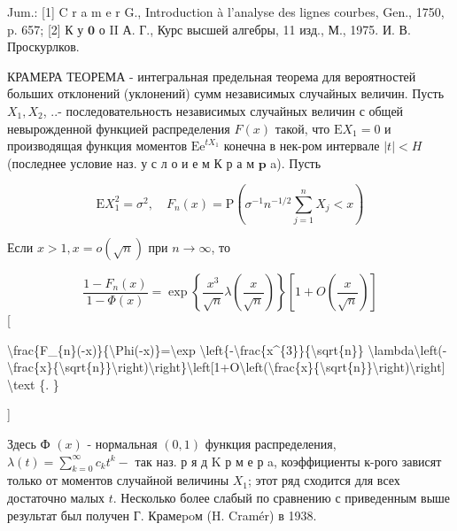 \documentclass[10pt]{article}
\begin{document}
Jum.: [1] C r a m e r G., Introduction à l'analyse des lignes courbes, Gen., 1750, p. 657; [2] К у $\mathbf{0}$ о II А. Г., Курс высшей алгебры, 11 изд., М., 1975. И. В. Проскурлков.



КРАМЕРА ТЕОРЕМА - интегральная предельная теорема для вероятностей больших отклонений (уклонений) сумм независимых случайных величин. Пусть $X_{1}, X_{2}$, ..- последовательность независимых случайных величин с общей невырожденной функцией распределения $F(x)$ такой, что $\mathrm{E} X_{1}=0$ и производящая функция моментов $\mathrm{Ee}^{t X_{1}}$ конечна в нек-ром интервале $|t|<H$ (последнее условие наз. у с л о и е м К р а м $\mathbf{p}$ a). Пусть



\[

\mathrm{E} X_{1}^{2}=\sigma^{2}, \quad F_{n}(x)=\mathrm{P}\left(\sigma^{-1} n^{-1 / 2} \sum_{j=1}^{n} X_{j}<x\right)

\]



Если $x>1, x=o(\sqrt{n})$ при $n \rightarrow \infty$, то



\[

\frac{1-F_{n}(x)}{1-\Phi(x)}=\exp \left\{\frac{x^{3}}{\sqrt{n}} \lambda\left(\frac{x}{\sqrt{n}}\right)\right\}\left[1+O\left(\frac{x}{\sqrt{n}}\right)\right]

\][



\textbackslash frac\{F\_\{n\}(-x)\}\{\textbackslash Phi(-x)\}=\textbackslash exp \textbackslash left\{-\textbackslash frac\{x\^{}\{3\}\}\{\textbackslash sqrt\{n\}\} \textbackslash lambda\textbackslash left(-\textbackslash frac\{x\}\{\textbackslash sqrt\{n\}\}\textbackslash right)\textbackslash right\}\textbackslash left[1+O\textbackslash left(\textbackslash frac\{x\}\{\textbackslash sqrt\{n\}\}\textbackslash right)\textbackslash right] \textbackslash text \{. \}

]



Здесь Ф $(x)$ - нормальная $(0,1)$ функция распределения, $\lambda(t)=\sum_{k=0}^{\infty} c_{k} t^{k}-$ так наз. р я д $\mathrm{K}$ р м е р a, коэффициенты к-рого зависят только от моментов случайной величины $X_{1}$; этот ряд сходится для всех достаточно малых $t$. Несколько более слабый по сравнению с приведенным выше результат был получен Г. Крамеpoм (H. Cramér) в 1938.
\end{document}
